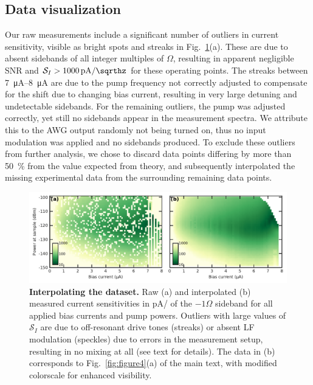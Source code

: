 \subsection{Data visualization}

Our raw measurements include a significant number of outliers in current sensitivity, visible as bright spots and streaks in Fig.~\ref{fig:fig4aclipnointerp}(a).
% 
These are due to absent sidebands of all integer multiples of $\Omega$, resulting in apparent negligible SNR and $\mathcal{S}_I > \SI{1000}{\pico\ampere/\sqrthz}$ for these operating points.
% 
The streaks between \SIrange{7}{8}{\micro\ampere} are due to the pump frequency not correctly adjusted to compensate for the shift due to changing bias current, resulting in very large detuning and undetectable sidebands.
% 
For the remaining outliers, the pump was adjusted correctly, yet still no sidebands appear in the measurement spectra.
%
We attribute this to the AWG output randomly not being turned on, thus no input modulation was applied and no sidebands produced.
% 
To exclude these outliers from further analysis, we chose to discard data points differing by more than \SI{50}{\percent} from the value expected from theory, and subsequently interpolated the missing experimental data from the surrounding remaining data points.

\begin{figure}
	\centering
	\includegraphics[width=\linewidth]{chapter-currentdetection/figures/SM_interpolation}
	\caption{
		\textbf{Interpolating the dataset.}
		Raw (a) and interpolated (b) measured current sensitivities in \si{\pico\ampere/\sqrthz} of the $-1\Omega$ sideband for all applied bias currents and pump powers.
		Outliers with large values of $\mathcal{S}_I$ are due to off-resonant drive tones (streaks) or absent LF modulation (speckles) due to errors in the measurement setup, resulting in no mixing at all (see text for details).
		The data in (b) corresponds to Fig.~\ref{fig:figure4}(a) of the main text, with modified colorscale for enhanced visibility.
	}
	\label{fig:fig4aclipnointerp}
\end{figure}

